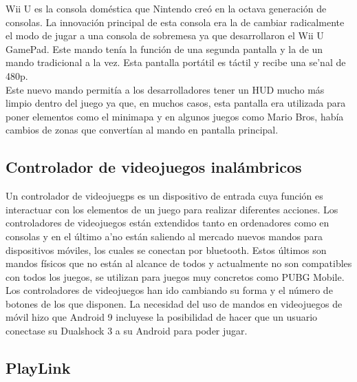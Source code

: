 Wii U es la consola dom\'estica que Nintendo cre\'o en la octava generaci\'on de consolas. La innovaci\'on principal de esta consola era la de cambiar radicalmente el modo de jugar a una consola de sobremesa ya que desarrollaron el Wii U GamePad. Este mando ten\'ia la funci\'on de una segunda pantalla y la de un mando tradicional a la vez. Esta pantalla port\'atil es t\'actil y recibe una se'nal de 480p.
\\
 Este nuevo mando permit\'ia a los desarrolladores tener un HUD mucho m\'as limpio dentro del juego ya que, en muchos casos, esta pantalla era utilizada para poner elementos como el minimapa y en algunos juegos como Mario Bros, hab\'ia cambios de zonas que convert\'ian al mando en pantalla principal. \\

\subsection{Controlador de videojuegos inal\'ambricos}
\label{cap2:subsec:GamePad}

Un controlador de videojuegps es un dispositivo de entrada cuya funci\'on es interactuar con los elementos de un juego para realizar diferentes acciones. Los controladores de videojuegos est\'an extendidos tanto en ordenadores como en consolas y en el \'ultimo a'no est\'an saliendo al mercado nuevos mandos para dispositivos m\'oviles, los cuales se conectan por bluetooth. Estos \'ultimos son mandos f\'isicos que no est\'an al alcance de todos y actualmente no son compatibles con todos los juegos, se utilizan para juegos muy concretos como PUBG Mobile. Los controladores de videojuegos han ido cambiando su forma y el n\'umero de botones de los que disponen. La necesidad del uso de mandos en videojuegos de m\'ovil hizo que Android 9 incluyese la posibilidad de hacer que un usuario conectase su Dualshock 3 a su Android para poder jugar.

\subsection{PlayLink}
\label{cap2:subsec:PlayLink}

